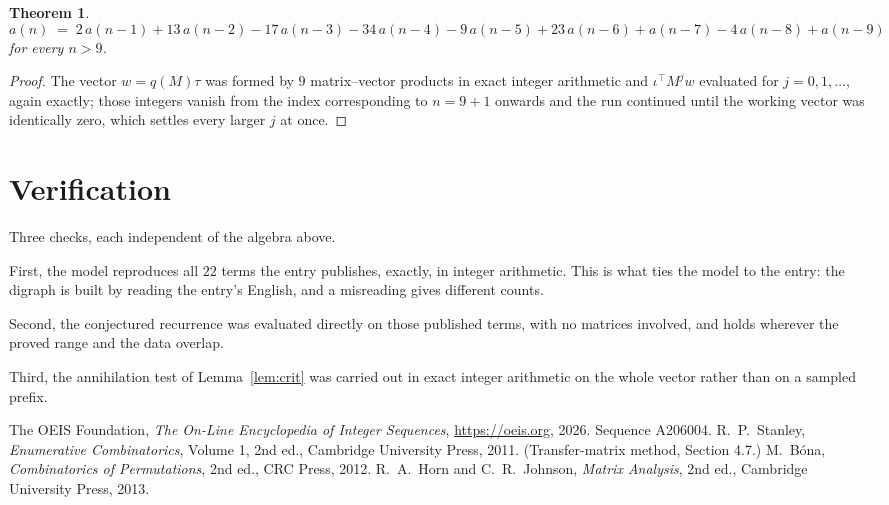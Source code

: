 \documentclass[11pt,a4paper]{article}
\theoremstyle{plain}
\newtheorem{theorem}{Theorem}
\theoremstyle{definition}
\begin{document}
\begin{theorem}
\[
a(n)\;=\;2\,a(n-1) + 13\,a(n-2) - 17\,a(n-3) - 34\,a(n-4) - 9\,a(n-5) + 23\,a(n-6) + a(n-7) - 4\,a(n-8) + a(n-9)
\]
for every $n>9$.
\end{theorem}

\begin{proof}
The vector $w=q(M)\tau$ was formed by $9$ matrix--vector products in exact integer
arithmetic and $\iota^{\!\top}M^{j}w$ evaluated for $j=0,1,\dots$, again exactly; those
integers vanish from the index corresponding to $n=9+1$ onwards and the run continued
until the working vector was identically zero, which settles every larger $j$ at once.
\end{proof}

\section{Verification}

Three checks, each independent of the algebra above.

First, the model reproduces all $22$ terms the entry publishes, exactly, in integer
arithmetic. This is what ties the model to the entry: the digraph is built by reading the
entry's English, and a misreading gives different counts.

Second, the conjectured recurrence was evaluated directly on those published terms, with no
matrices involved, and holds wherever the proved range and the data overlap.

Third, the annihilation test of Lemma~\ref{lem:crit} was carried out in exact integer
arithmetic on the whole vector rather than on a sampled prefix.

\begin{thebibliography}{9}
 The OEIS Foundation, \emph{The On-Line Encyclopedia of Integer
Sequences}, \url{https://oeis.org}, 2026. Sequence A206004.
 R.~P.~Stanley, \emph{Enumerative Combinatorics}, Volume 1, 2nd ed.,
Cambridge University Press, 2011. (Transfer-matrix method, Section 4.7.)
 M.~B\'ona, \emph{Combinatorics of Permutations}, 2nd ed., CRC
Press, 2012.
 R.~A.~Horn and C.~R.~Johnson, \emph{Matrix Analysis}, 2nd ed., Cambridge
University Press, 2013.
\end{thebibliography}
\end{document}
